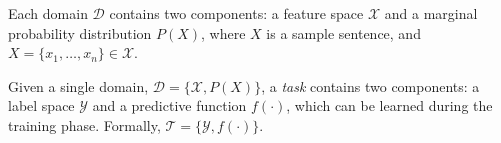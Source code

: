 Each domain $\mathcal{D}$ contains two components: a feature space $\mathcal{X}$ and a marginal probability distribution $P(X)$, where $X$ is a sample sentence,
and $X = \{x_1, \ldots, x_n\} \in \mathcal{X}$. 


Given a single domain, $\mathcal{D} = \{\mathcal{X}, P(X)\}$, a \textit{task} contains two components: a label space $\mathcal{Y}$ and a predictive function $f(\cdot)$, which can be learned during the training phase. Formally, $\mathcal{T} = \{\mathcal{Y}, f(\cdot)\}$.


